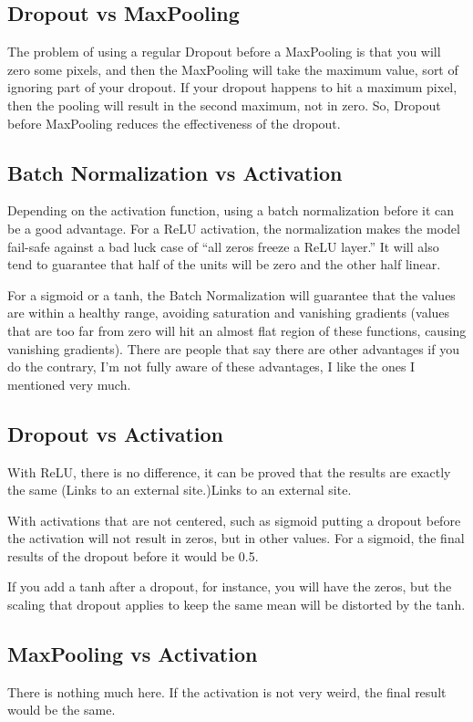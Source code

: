 	\subsection{Dropout vs MaxPooling}
The problem of using a regular Dropout before a MaxPooling is that you will zero some pixels, and then the MaxPooling will take the maximum value, sort of ignoring part of your dropout. If your dropout happens to hit a maximum pixel, then the pooling will result in the second maximum, not in zero.
So, Dropout before MaxPooling reduces the effectiveness of the dropout.

	\subsection{Batch Normalization vs Activation}
Depending on the activation function, using a batch normalization before it can be a good advantage.
For a ReLU activation, the normalization makes the model fail-safe against a bad luck case of ``all zeros freeze a ReLU layer.''  It will also tend to guarantee that half of the units will be zero and the other half linear.

For a sigmoid or a tanh, the Batch Normalization will guarantee that the values are within a healthy range, avoiding saturation and vanishing gradients (values that are too far from zero will hit an almost flat region of these functions, causing vanishing gradients).
There are people that say there are other advantages if you do the contrary, I'm not fully aware of these advantages, I like the ones I mentioned very much.

	\subsection{Dropout vs Activation}
With ReLU, there is no difference, it can be proved that the results are exactly the same (Links to an external site.)Links to an external site.

With activations that are not centered, such as sigmoid putting a dropout before the activation will not result in zeros, but in other values.  For a sigmoid, the final results of the dropout before it would be 0.5.

If you add a tanh after a dropout, for instance, you will have the zeros, but the scaling that dropout applies to keep the same mean will be distorted by the tanh.

	\subsection{MaxPooling vs Activation}
There is nothing much here. If the activation is not very weird, the final result would be the same.

